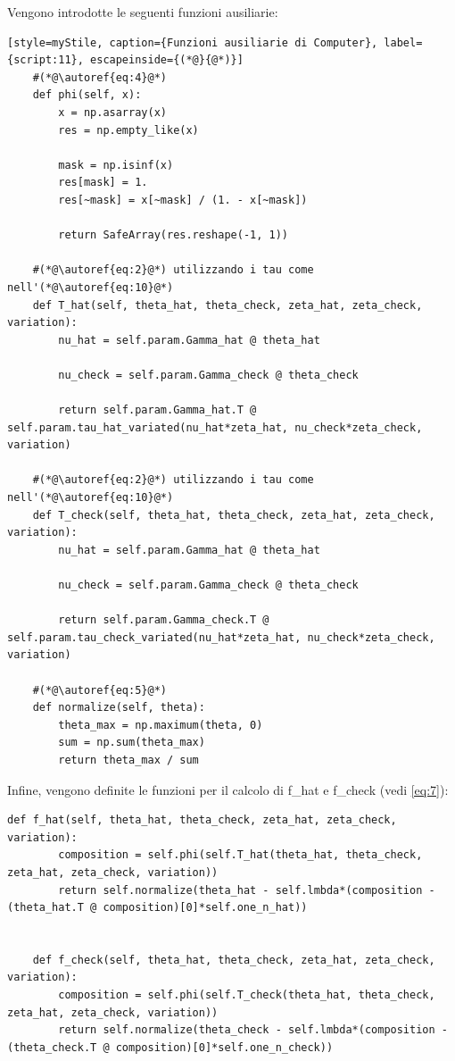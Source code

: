 Vengono introdotte le seguenti funzioni ausiliarie:

\begin{lstlisting}[style=myStile, caption={Funzioni ausiliarie di Computer}, label={script:11}, escapeinside={(*@}{@*)}]
    #(*@\autoref{eq:4}@*)
    def phi(self, x):
        x = np.asarray(x)
        res = np.empty_like(x)

        mask = np.isinf(x)
        res[mask] = 1.
        res[~mask] = x[~mask] / (1. - x[~mask])

        return SafeArray(res.reshape(-1, 1))
    
    #(*@\autoref{eq:2}@*) utilizzando i tau come nell'(*@\autoref{eq:10}@*)
    def T_hat(self, theta_hat, theta_check, zeta_hat, zeta_check, variation):
        nu_hat = self.param.Gamma_hat @ theta_hat

        nu_check = self.param.Gamma_check @ theta_check

        return self.param.Gamma_hat.T @ self.param.tau_hat_variated(nu_hat*zeta_hat, nu_check*zeta_check, variation)
    
    #(*@\autoref{eq:2}@*) utilizzando i tau come nell'(*@\autoref{eq:10}@*)
    def T_check(self, theta_hat, theta_check, zeta_hat, zeta_check, variation):
        nu_hat = self.param.Gamma_hat @ theta_hat

        nu_check = self.param.Gamma_check @ theta_check

        return self.param.Gamma_check.T @ self.param.tau_check_variated(nu_hat*zeta_hat, nu_check*zeta_check, variation)
    
    #(*@\autoref{eq:5}@*)
    def normalize(self, theta):
        theta_max = np.maximum(theta, 0)
        sum = np.sum(theta_max)
        return theta_max / sum
\end{lstlisting}

Infine, vengono definite le funzioni per il calcolo di f\_hat e f\_check (vedi \autoref{eq:7}):

\begin{lstlisting}[style=myStile, caption={Computer::f\_hat, Computer::f\_check}, label={script:12}]
    def f_hat(self, theta_hat, theta_check, zeta_hat, zeta_check, variation):
        composition = self.phi(self.T_hat(theta_hat, theta_check, zeta_hat, zeta_check, variation))
        return self.normalize(theta_hat - self.lmbda*(composition - (theta_hat.T @ composition)[0]*self.one_n_hat))
    
    
    def f_check(self, theta_hat, theta_check, zeta_hat, zeta_check, variation):
        composition = self.phi(self.T_check(theta_hat, theta_check, zeta_hat, zeta_check, variation))
        return self.normalize(theta_check - self.lmbda*(composition - (theta_check.T @ composition)[0]*self.one_n_check))
\end{lstlisting}